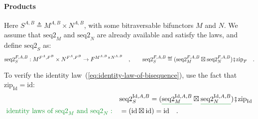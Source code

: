 \paragraph{Products}

Here $S^{A,B}\triangleq M^{A,B}\times N^{A,B}$, with some bitraversable
bifunctors $M$ and $N$. We assume that $\text{seq2}_{M}$ and $\text{seq2}_{N}$
are already available and satisfy the laws, and define $\text{seq2}_{S}$
as:
\[
\text{seq2}_{S}^{F,A,B}:M^{F^{A},F^{B}}\times N^{F^{A},F^{B}}\rightarrow F^{M^{A,B}\times N^{A,B}}\quad,\quad\quad\text{seq2}_{S}^{F,A,B}\triangleq(\text{seq2}_{M}^{F,A,B}\boxtimes\text{seq2}_{N}^{F,A,B})\bef\text{zip}_{F}\quad.
\]

To verify the identity law~(\ref{eq:identity-law-of-bisequence}),
use the fact that $\text{zip}_{\text{Id}}=\text{id}$:
\begin{align*}
 & \text{seq2}_{S}^{\text{Id},A,B}=(\gunderline{\text{seq2}_{M}^{\text{Id},A,B}}\boxtimes\gunderline{\text{seq2}_{N}^{\text{Id},A,B}})\bef\text{zip}_{\text{Id}}\\
{\color{greenunder}\text{identity laws of }\text{seq2}_{M}\text{ and }\text{seq2}_{N}:}\quad & =(\text{id}\boxtimes\text{id})=\text{id}\quad.
\end{align*}

